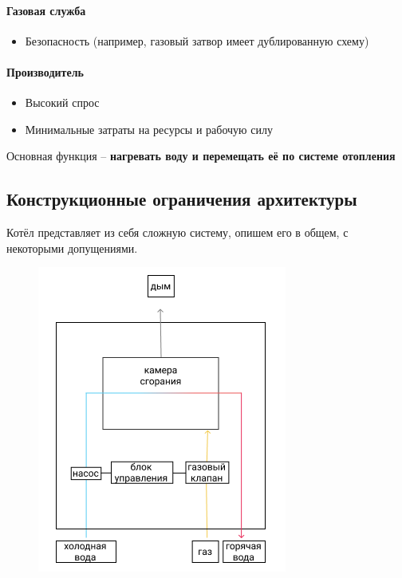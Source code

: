 \documentclass[bibliography=totocnumbered]{scrartcl}
\begin{document}
\paragraph{Газовая служба}
\begin{itemize}
  \item Безопасность (например, газовый затвор имеет дублированную схему)
\end{itemize}

\paragraph{Производитель}
\begin{itemize}
  \item Высокий спрос
  \item Минимальные затраты на ресурсы и рабочую силу
\end{itemize}
Основная функция -- \textbf{нагревать воду и перемещать её по системе отопления}

\subsection{Конструкционные ограничения архитектуры}
Котёл представляет из себя сложную систему, опишем его в общем, с некоторыми допущениями.

\begin{figure}[htp]
  \centering
  \includegraphics[scale=1.00]{arch.png}
\end{figure}
\end{document}
